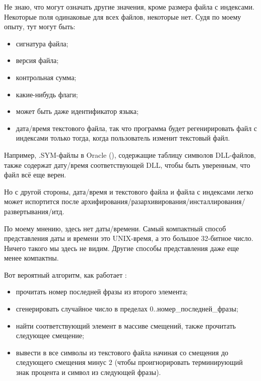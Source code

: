\begin{figure}[H]
\centering
{}
\end{figure}

Не знаю, что могут означать другие значения, кроме размера файла с индексами.
Некоторые поля одинаковые для всех файлов, некоторые нет.
Судя по моему опыту, тут могут быть:

\begin{itemize}
\item сигнатура файла;
\item версия файла;
\item контрольная сумма;
\item какие-нибудь флаги;
\item может быть даже идентификатор языка;
\item дата/время текстового файла, так что программа  будет регенирировать файл с индексами только тогда, когда
пользователь изменит текстовый файл.
\end{itemize}

Например, .SYM-файлы в Oracle (), содержащие таблицу символов DLL-файлов,
также содержат дату/время соответствующей DLL, чтобы быть уверенным, что файл всё еще верен.

Но с другой стороны, дата/время и текстового файла и файла с индексами легко может испортится после
архифирования/разархивирования/инсталлирования/развертывания/итд.

По моему мнению, здесь нет даты/времени. Самый компактный способ представления даты и времени это UNIX-время,
а это большое 32-битное число. Ничего такого мы здесь не видим. Другие способы представления даже еще менее компактны.

Вот вероятный алгоритм, как работает :

\begin{itemize}
\item прочитать номер последней фразы из второго элемента;
\item сгенерировать случайное число в пределах 0..номер\_последней\_фразы;
\item найти соответствующий элемент в массиве смещений, также прочитать следующее смещение;
\item вывести в  все символы из текстового файла начиная со смещения до следующего смещения минус 2 (чтобы
проигнорировать терминирующий знак процента и символ из следующей фразы).
\end{itemize}


